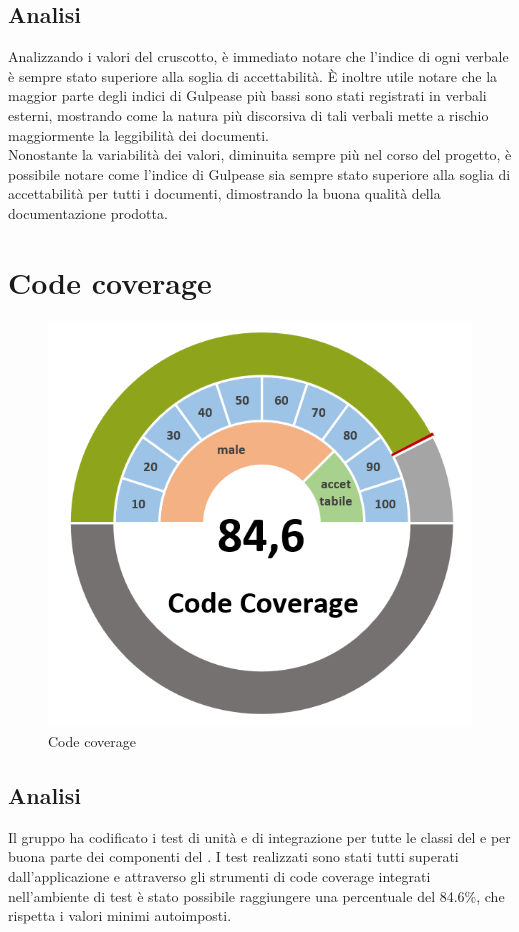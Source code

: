 \subsection{Analisi}
Analizzando i valori del cruscotto, è immediato notare che l'indice di ogni verbale è sempre stato superiore alla soglia di accettabilità. È inoltre utile notare che la maggior parte degli indici di Gulpease più bassi sono stati registrati in verbali esterni, mostrando come la natura più discorsiva di tali verbali mette a rischio maggiormente la leggibilità dei documenti.\\
Nonostante la variabilità dei valori, diminuita sempre più nel corso del progetto, è possibile notare come l'indice di Gulpease sia sempre stato superiore alla soglia di accettabilità per tutti i documenti, dimostrando la buona qualità della documentazione prodotta. 

\section{Code coverage}
\begin{figure}[H]
    \centering
    \includegraphics[width=0.45\linewidth]{codecoverage.png}
    \caption{Code coverage}
\end{figure}
\subsection{Analisi}
Il gruppo ha codificato i test di unità e di integrazione per tutte le classi del  e per buona parte dei componenti del . I test realizzati sono stati tutti superati dall'applicazione e attraverso gli strumenti di code coverage integrati nell'ambiente di test è stato possibile raggiungere una percentuale del 84.6\%, che rispetta i valori minimi autoimposti. 